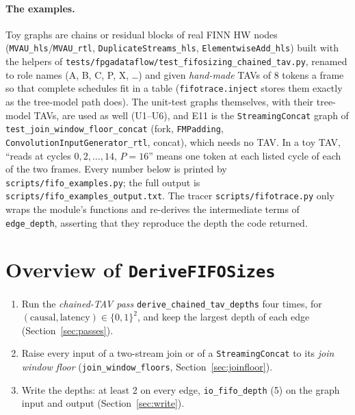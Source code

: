 \documentclass[10pt,a4paper]{article}
\newcommand{\code}[1]{\texttt{#1}}
\begin{document}
\paragraph{The examples.} Toy graphs are chains or residual blocks of real FINN
HW nodes (\code{MVAU\_hls}/\code{MVAU\_rtl}, \code{DuplicateStreams\_hls},
\code{ElementwiseAdd\_hls}) built with the helpers of
\code{tests/fpgadataflow/test\_fifosizing\_chained\_tav.py}, renamed to role names
(A, B, C, P, X, \dots) and given \emph{hand-made} TAVs of 8 tokens a frame so
that complete schedules fit in a table (\code{fifotrace.inject} stores them
exactly as the tree-model path does). The unit-test graphs themselves, with
their tree-model TAVs, are used as well (U1--U6), and E11 is the
\code{StreamingConcat} graph of \code{test\_join\_window\_floor\_concat} (fork,
\code{FMPadding}, \code{ConvolutionInputGenerator\_rtl}, concat), which needs no TAV. In a toy TAV, ``reads at
cycles $0,2,\dots,14$, $P=16$'' means one token at each listed cycle of each of
the two frames. Every number below is printed by
\code{scripts/fifo\_examples.py}; the full output is
\code{scripts/fifo\_examples\_output.txt}. The tracer \code{scripts/fifotrace.py} only wraps the
module's functions and re-derives the intermediate terms of \code{edge\_depth},
asserting that they reproduce the depth the code returned.

\section{Overview of \code{DeriveFIFOSizes}}\label{sec:overview}

\begin{enumerate}
\item Run the \emph{chained-TAV pass} \code{derive\_chained\_tav\_depths} four times,
  for $(\text{causal},\text{latency})\in\{0,1\}^2$, and keep the largest depth of
  each edge (Section~\ref{sec:passes}).
\item Raise every input of a two-stream join or of a \code{StreamingConcat} to its
  \emph{join window floor} (\code{join\_window\_floors}, Section~\ref{sec:joinfloor}).
\item Write the depths: at least 2 on every edge, \code{io\_fifo\_depth} (5) on the graph
  input and output (Section~\ref{sec:write}).
\end{enumerate}
\end{document}
